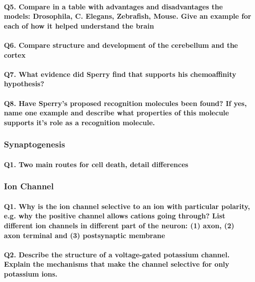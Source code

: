 \documentclass[12pt,article,oneside,a4paper]{memoir}
\begin{document}
\paragraph{Q5. Compare in a table with advantages and disadvantages the models: Drosophila, C. Elegans, Zebrafish, Mouse. Give an example for each of how it helped understand the brain}
\paragraph{Q6. Compare structure and development of the cerebellum and the cortex}
\paragraph{Q7. What evidence did Sperry find that supports his chemoaffinity hypothesis?}
\paragraph{Q8. Have Sperry’s proposed recognition molecules been found? If yes, name one example and describe what properties of this molecule supports it’s role as a recognition molecule.}

\subsubsection{Synaptogenesis}
\paragraph{Q1. Two main routes for cell death, detail differences}

\subsubsection{Ion Channel}
\paragraph{Q1. Why is the ion channel selective to an ion with particular polarity, e.g. why the positive channel allows cations going through? List different ion channels in different part of the neuron: (1) axon, (2) axon terminal and (3) postsynaptic membrane}
\paragraph{Q2. Describe the structure of a voltage-gated potassium channel. Explain the mechanisms that make the channel selective for only potassium ions.}
\end{document}
